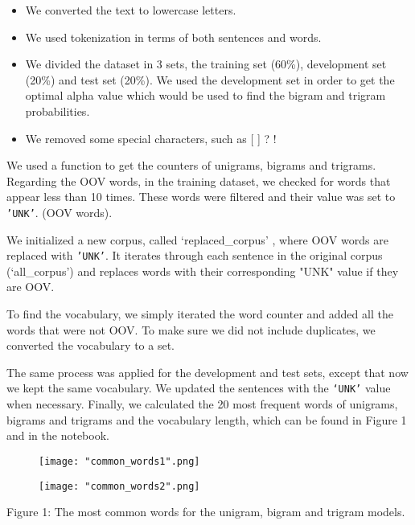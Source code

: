 \documentclass[11pt, a4paper]{article}
\begin{document}
	\begin{itemize}
		\item We converted the text to lowercase letters.
		\item We used tokenization in terms of both sentences and words.
		\item We divided the dataset in 3 sets, the training set (60\%), development set (20\%) and test set (20\%). We used the development set in order to get the optimal alpha value which would be used to find the bigram and trigram probabilities.
		\item We removed some special characters, such as [ ] ? !
		
	\end{itemize}

	
	We used a function to get the counters of unigrams, bigrams and trigrams.  Regarding the OOV words, in the training dataset, we checked for words that appear less than 10 times. These words were filtered and their value was set to \texttt{'UNK'}. (OOV words).
	
	We initialized a new corpus, called ‘replaced\_corpus’ , where  OOV words are replaced with \texttt{'UNK'}. It iterates through each sentence in the original corpus (‘all\_corpus’) and replaces words with their corresponding "UNK" value if they are OOV.
	
	To find the vocabulary, we simply iterated the word counter and added all the words that were not OOV. To make sure we did not include duplicates, we converted the vocabulary to a set.
	
	The same process was applied for the development and test sets, except that now we kept the same vocabulary. We updated the sentences with the \texttt{‘UNK’} value when necessary. Finally, we calculated the 20 most frequent words of unigrams, bigrams and trigrams and the vocabulary length, which can be found in Figure 1 and in the notebook.

 \begin{figure}[H]
    \centering
    \texttt{[image: "common\_words1".png]}
    
    \label{fig:galaxy}
\end{figure}

 \begin{figure}[H]
    \centering
    \texttt{[image: "common\_words2".png]}
    
    \label{fig:galaxy}
\end{figure}


\begin{centering}



\renewcommand{\caption}{Figure 1: }
\caption{The most common words for the unigram, bigram and trigram models.}

\end{centering}
	
\end{document}
